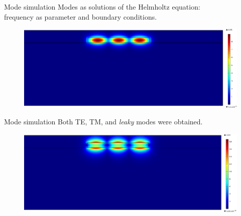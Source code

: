 \documentclass[11pt, leqno]{beamer}
\begin{document}
\begin{frame}{Mode simulation}
	Modes as solutions of the Helmholtz equation:\\
	frequency as parameter and boundary conditions.
	\begin{figure}
		\centering
		\includegraphics[width=\textwidth]{output_modeTE.pdf}
	\end{figure}
\end{frame}
\begin{frame}{Mode simulation}
	Both TE, TM, and \textit{leaky} modes were obtained.
	\begin{figure}
		\centering
		\includegraphics[width=\textwidth]{output_modeTM.pdf}
	\end{figure}
\end{frame}
\end{document}
